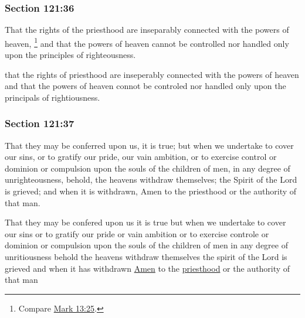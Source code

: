 	\subsubsection{Section 121:36} %
		\label{DC121-36}

		That the rights of the priesthood are inseparably connected with the powers of heaven,%
			\footnote{%
				Compare \hyperref[MARK-13-25]{Mark 13:25}.
				}
		and that the powers of heaven cannot be controlled nor handled only upon the principles of righteousness.
		
		\begin{framed}
		\scriptsize
			\begin{compactdesc}
				\item[JSP] that the rights of priesthood are inseperably connected with the powers of heaven and that the powers of heaven connot be controled nor handled only upon the principals of rightiousness.
			\end{compactdesc}
		\end{framed}
		
	\subsubsection{Section 121:37} %
		\label{DC121-37}

		That they may be conferred upon us, it is true; but when we undertake to cover our sins, or to gratify our pride, our vain ambition, or to exercise control or dominion or compulsion upon the souls of the children of men, in any degree of unrighteousness, behold, the heavens withdraw themselves; the Spirit of the Lord is grieved; and when it is withdrawn, Amen to the priesthood or the authority of that man.
		
		\begin{framed}
		\scriptsize
			\begin{compactdesc}
				\item[JSP] That they may be confered upon us it is true but when we undertake to cover our sins or to gratify our pride or vain ambition or to exercise controle or dominion or compulsion upon the souls of the children of men in any degree of unritiousness behold the heavens withdraw themselves the spirit of the Lord is grieved and when it has withdrawn \uline{Amen} to the \uline{priesthood} or the authority of that man
			\end{compactdesc}
		\end{framed}
		
